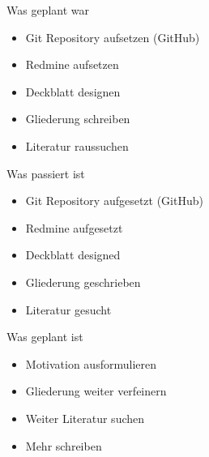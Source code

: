 \documentclass{beamer}
\institute{Universität Hamburg -- Fachbereich Informatik -- Abschlussarbeiten Seminar}
\date{\today}
\title{\myTitle}
\author{\myName}
\begin{document}
{
    \frame{  
        \titlepage
    }
}

\begin{frame}{Was geplant war}
  \begin{itemize}
    \item Git Repository aufsetzen (GitHub)
    \item Redmine aufsetzen
    \item Deckblatt designen
    \item Gliederung schreiben
    \item Literatur raussuchen
  \end{itemize}
\end{frame}

\begin{frame}{Was passiert ist}
  \begin{itemize}
    \item Git Repository aufgesetzt (GitHub)
    \item Redmine aufgesetzt
    \item Deckblatt designed
    \item Gliederung geschrieben
    \item Literatur gesucht
  \end{itemize}
\end{frame}

\begin{frame}{Was geplant ist}
  \begin{itemize}
    \item Motivation ausformulieren
    \item Gliederung weiter verfeinern
    \item Weiter Literatur suchen
    \item Mehr schreiben
  \end{itemize}
\end{frame}
\end{document}
